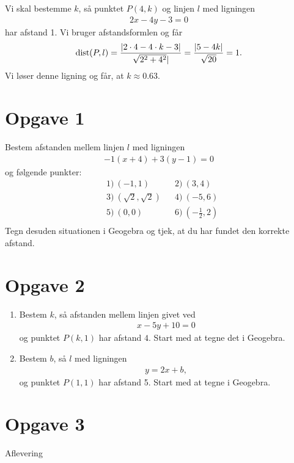 \begin{exa}
Vi skal bestemme $k$, så punktet $P(4,k)$ og linjen $l$ med ligningen 
\begin{align*}
2x-4y-3 = 0
\end{align*}
har afstand 1. Vi bruger afstandsformlen og får
\begin{align*}
\textnormal{dist}(P,l) = \frac{|2\cdot 4-4\cdot k-3|}{\sqrt{2^2+4^2}|} = \frac{|5-4k|}{\sqrt{20}} =  1.
\end{align*}
Vi løser denne ligning og får, at $k \approx 0.63$. 
\end{exa}

\section*{Opgave 1}
Bestem afstanden mellem linjen $l$ med ligningen 
\begin{align*}
-1(x+4) + 3(y-1) = 0
\end{align*}
og følgende punkter:
\begin{align*}
&1) \ (-1,1)  &&2) \ (3,4)    \\
&3) \ (\sqrt{2},\sqrt{2})  &&4) \ (-5,6)   \\
&5) \ (0,0)  &&6) \  (-\frac{1}{2},2)   \\
\end{align*}
Tegn desuden situationen i Geogebra og tjek, at du har fundet den korrekte afstand. 

\section*{Opgave 2}
\begin{enumerate}[label=\roman*)]
\item Bestem $k$, så afstanden mellem linjen givet ved 
\begin{align*}
x-5y+10 = 0
\end{align*}
og punktet $P(k,1)$ har afstand $4$. Start med at tegne det i Geogebra.
\item Bestem $b$, så $l$ med ligningen
\begin{align*}
y = 2x+b,
\end{align*}
 og punktet $P(1,1)$ har afstand 5. Start med at tegne i Geogebra.
\end{enumerate}

\section*{Opgave 3}
Aflevering
